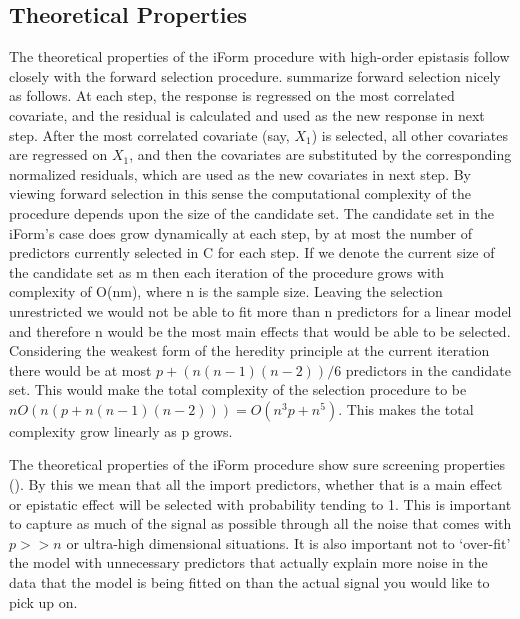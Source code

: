 \documentclass[11pt,]{book}
\theoremstyle{definition}
\theoremstyle{definition}
\theoremstyle{remark}
\begin{document}
\subsection{Theoretical Properties}\label{theoretical-properties}

The theoretical properties of the iForm procedure with high-order
epistasis follow closely with the forward selection procedure.
\cite{hao2014interaction} summarize forward selection nicely as follows.
At each step, the response is regressed on the most correlated
covariate, and the residual is calculated and used as the new response
in next step. After the most correlated covariate (say, \(X_1\)) is
selected, all other covariates are regressed on \(X_1\), and then the
covariates are substituted by the corresponding normalized residuals,
which are used as the new covariates in next step. By viewing forward
selection in this sense the computational complexity of the procedure
depends upon the size of the candidate set. The candidate set in the
iForm's case does grow dynamically at each step, by at most the number
of predictors currently selected in C for each step. If we denote the
current size of the candidate set as m then each iteration of the
procedure grows with complexity of O(nm), where n is the sample size.
Leaving the selection unrestricted we would not be able to fit more than
n predictors for a linear model and therefore n would be the most main
effects that would be able to be selected. Considering the weakest form
of the heredity principle at the current iteration there would be at
most \(p + (n(n-1)(n-2))/6\) predictors in the candidate set. This would
make the total complexity of the selection procedure to be
\(nO(n(p+n(n-1)(n-2))) = O(n^3 p+n^5)\). This makes the total complexity
grow linearly as p grows.

The theoretical properties of the iForm procedure show sure screening
properties (\cite{fan2008sure}). By this we mean that all the import
predictors, whether that is a main effect or epistatic effect will be
selected with probability tending to 1. This is important to capture as
much of the signal as possible through all the noise that comes with
\(p >> n\) or ultra-high dimensional situations. It is also important
not to `over-fit' the model with unnecessary predictors that actually
explain more noise in the data that the model is being fitted on than
the actual signal you would like to pick up on.
\end{document}
